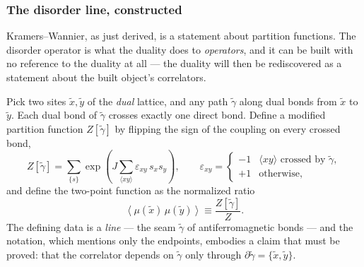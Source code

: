 \subsubsection{The disorder line, constructed}
\label{sec:disorder-constructed}

Kramers--Wannier, as just derived, is a statement about partition
functions. The disorder operator is what the duality does to
\emph{operators}, and it can be built with no reference to the duality at
all --- the duality will then be rediscovered as a statement about the
built object's correlators.

Pick two sites $\tilde x, \tilde y$ of the \emph{dual} lattice, and any
path $\tilde\gamma$ along dual bonds from $\tilde x$ to $\tilde y$. Each
dual bond of $\tilde\gamma$ crosses exactly one direct bond. Define a
modified partition function $Z[\tilde\gamma]$ by flipping the sign of the
coupling on every crossed bond,
\begin{equation}
Z[\tilde\gamma] = \sum_{\{s\}} \exp\left( J \sum_{\langle xy\rangle}
\varepsilon_{xy}\, s_x s_y \right),
\qquad
\varepsilon_{xy} =
\begin{cases}
-1 & \langle xy \rangle \text{ crossed by } \tilde\gamma, \\
+1 & \text{otherwise},
\end{cases}
\label{eq:flipped-Z}
\end{equation}
and define the  two-point function as the
normalized ratio
\begin{equation}
\left\langle \mu(\tilde x)\, \mu(\tilde y) \right\rangle
\equiv \frac{Z[\tilde\gamma]}{Z} .
\label{eq:mu-def}
\end{equation}
The defining data is a \emph{line} --- the seam $\tilde\gamma$ of
antiferromagnetic bonds --- and the notation, which mentions only the
endpoints, embodies a claim that must be proved: that the correlator
depends on $\tilde\gamma$ only through $\partial\tilde\gamma = \{\tilde
x, \tilde y\}$.

